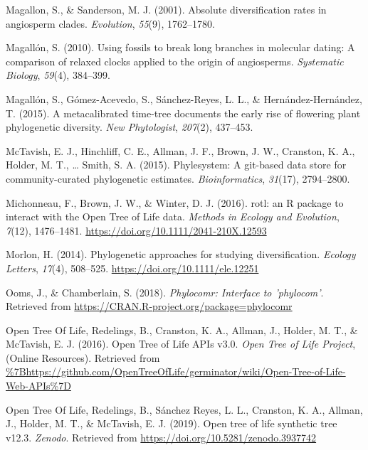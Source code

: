 \documentclass[
  english,
  man]{apa6}
\newlength{\cslhangindent}
\newlength{\cslentryspacingunit} %
\newenvironment{CSLReferences}[2] %
 {%
  \setlength{\parindent}{0pt}
  \ifodd #1
  \let\oldpar\par
  \def\par{\hangindent=\cslhangindent\oldpar}
  \fi
  \setlength{\parskip}{#2\cslentryspacingunit}
 }%
 {}
\begin{document}
\begin{CSLReferences}{1}{0}
\leavevmode{}%
Magallon, S., \& Sanderson, M. J. (2001). Absolute diversification rates in angiosperm clades. \emph{Evolution}, \emph{55}(9), 1762--1780.

\leavevmode{}%
Magallón, S. (2010). Using fossils to break long branches in molecular dating: A comparison of relaxed clocks applied to the origin of angiosperms. \emph{Systematic Biology}, \emph{59}(4), 384--399.

\leavevmode{}%
Magallón, S., Gómez-Acevedo, S., Sánchez-Reyes, L. L., \& Hernández-Hernández, T. (2015). A metacalibrated time-tree documents the early rise of flowering plant phylogenetic diversity. \emph{New Phytologist}, \emph{207}(2), 437--453.

\leavevmode{}%
McTavish, E. J., Hinchliff, C. E., Allman, J. F., Brown, J. W., Cranston, K. A., Holder, M. T., \ldots{} Smith, S. A. (2015). Phylesystem: A git-based data store for community-curated phylogenetic estimates. \emph{Bioinformatics}, \emph{31}(17), 2794--2800.

\leavevmode{}%
Michonneau, F., Brown, J. W., \& Winter, D. J. (2016). {rotl: an R package to interact with the Open Tree of Life data}. \emph{{Methods in Ecology and Evolution}}, \emph{7}(12), 1476--1481. \url{https://doi.org/10.1111/2041-210X.12593}

\leavevmode{}%
Morlon, H. (2014). {Phylogenetic approaches for studying diversification.} \emph{{Ecology Letters}}, \emph{17}(4), 508--525. \url{https://doi.org/10.1111/ele.12251}

\leavevmode{}%
Ooms, J., \& Chamberlain, S. (2018). \emph{Phylocomr: Interface to 'phylocom'}. Retrieved from \url{https://CRAN.R-project.org/package=phylocomr}

\leavevmode{}%
Open Tree Of Life, Redelings, B., Cranston, K. A., Allman, J., Holder, M. T., \& McTavish, E. J. (2016). {Open Tree of Life APIs v3.0}. \emph{{Open Tree of Life Project}}, (Online Resources). Retrieved from \url{\%7Bhttps://github.com/OpenTreeOfLife/germinator/wiki/Open-Tree-of-Life-Web-APIs\%7D}

\leavevmode{}%
Open Tree Of Life, Redelings, B., Sánchez Reyes, L. L., Cranston, K. A., Allman, J., Holder, M. T., \& McTavish, E. J. (2019). Open tree of life synthetic tree v12.3. \emph{Zenodo}. Retrieved from \url{https://doi.org/10.5281/zenodo.3937742}


\end{CSLReferences}
\end{document}
